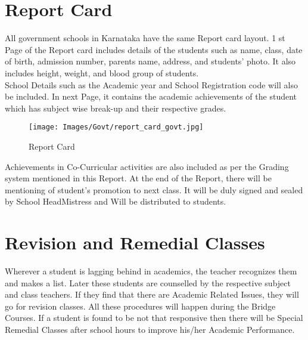 \section{Report Card} 
All government schools in Karnataka have the same Report card layout. 1 st Page of the Report card includes details of the students such as name, class, date of birth, admission number, parents name, address, and students' photo. It also includes height, weight, and blood group of students. \\
School Details such as the Academic year and School Registration code will also be included. In next Page, it contains the academic achievements of the student which has subject wise break-up and their respective grades. 

\begin{figure}[H]
    \centering
    \texttt{[image: Images/Govt/report\_card\_govt.jpg]}
    \caption*{Report Card}
\end{figure}

Achievements in Co-Curricular activities are also included as per the Grading system mentioned in this Report. At the end of the Report, there will be mentioning of student's promotion to next class. It will be duly signed and sealed by School HeadMistress and Will be distributed to students.

\section{Revision and Remedial Classes}
Wherever a student is lagging behind in academics, the teacher recognizes them and makes a list. Later these students are counselled by the respective subject and class teachers. If they find that there are Academic Related Issues, they will go for revision classes. All these procedures will happen during the Bridge Courses. If a student is found to be not that responsive then there will be Special Remedial Classes after school hours to improve his/her Academic Performance. 

